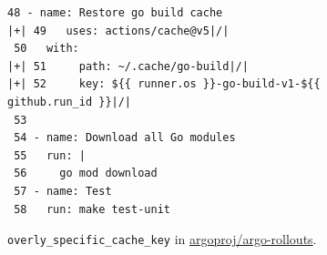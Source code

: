 \begin{figure}[htbp]
\centering
\begin{lstlisting}[style=ccscase,aboveskip=2pt,belowskip=3pt]
 48 - name: Restore go build cache
|+| 49   uses: actions/cache@v5|/|
 50   with:
|+| 51     path: ~/.cache/go-build|/|
|+| 52     key: ${{ runner.os }}-go-build-v1-${{ github.run_id }}|/|
 53 
 54 - name: Download all Go modules
 55   run: |
 56     go mod download
 57 - name: Test
 58   run: make test-unit
\end{lstlisting}
\caption{\texttt{overly\_specific\_cache\_key} in \href{https://github.com/argoproj/argo-rollouts/blob/16d28f8d6cdb35ec0e53b8ce8786c65f160bb1e2/.github/workflows/testing.yaml}{argoproj/argo-rollouts}.}
\label{fig:ccs-specific-key-code}
\end{figure}
